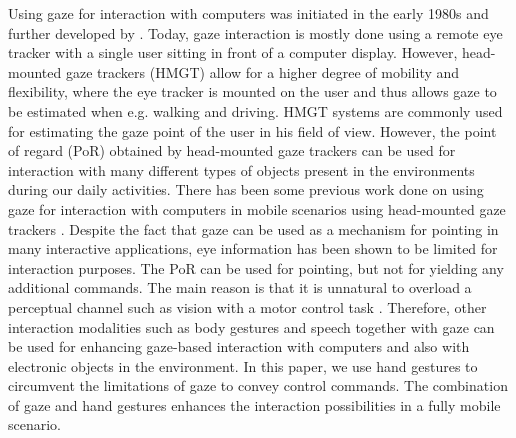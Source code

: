 \documentclass[jou,a4paper,notxfonts]{apa}
\begin{document}
Using gaze for interaction with computers was initiated in the early 1980s \cite{bolt1982eyes} and further developed by \cite{ware1987evaluation}. Today, gaze interaction is mostly done using a remote eye tracker with a single user sitting in front of a
computer display. However, head-mounted gaze trackers (HMGT) allow for a higher degree of mobility and flexibility,
where the eye tracker is mounted on the user and thus allows gaze to be estimated when e.g. walking and driving. HMGT
systems are commonly used for estimating the gaze point of the user in his field of view. However, the point of regard
(PoR) obtained by head-mounted gaze trackers can be used for interaction with many different types of objects present in  the environments during our daily activities. There has been some previous work done on using gaze for interaction with computers in
mobile scenarios using head-mounted gaze trackers \cite{Mardanbegi2011}. Despite the fact that gaze can be used as a mechanism for pointing in many interactive applications, eye information has been shown to be limited for interaction purposes.
The PoR can be used for pointing, but not for yielding any additional commands. The main reason is that it is unnatural
to overload a perceptual channel such as vision with a motor control task \cite{magicPointing}.
Therefore, other interaction modalities such as body gestures and speech together with gaze can be used for enhancing
gaze-based interaction with computers and also with electronic objects in the environment.  In this paper, we use
hand gestures to circumvent the limitations of gaze to convey control commands. The combination of gaze and hand
gestures enhances the interaction possibilities in a fully mobile scenario.
 
\end{document}
